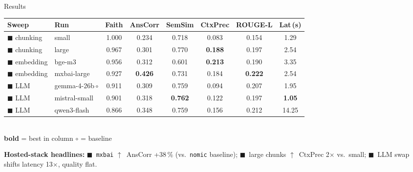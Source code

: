 \documentclass{beamer}
\begin{document}
\begin{frame}{}
\begin{columns}[t, totalwidth=\textwidth]
\begin{column}{0.495\textwidth}
\begin{block}{Results}
	
	\begin{center}
	\renewcommand{\arraystretch}{1.1}
	\setlength{\tabcolsep}{3pt}
	\scriptsize
	\begin{tabular}{@{}l l c c c c c c@{}}
		\toprule
		\textbf{Sweep} & \textbf{Run} & \textbf{Faith} & \textbf{AnsCorr} & \textbf{SemSim} & \textbf{CtxPrec} & \textbf{ROUGE-L} & \textbf{Lat\,(s)} \\
		\midrule
		\textcolor{RMmidnight}{$\blacksquare$} chunking & small             & 1.000 & 0.234 & 0.718 & 0.083 & 0.154 & 1.29 \\
		\textcolor{RMmidnight}{$\blacksquare$} chunking & large             & 0.967 & 0.301 & 0.770 & \textbf{0.188} & 0.197 & 2.54 \\
		\textcolor{RMember}{$\blacksquare$} embedding   & bge-m3            & 0.956 & 0.312 & 0.601 & \textbf{0.213} & 0.190 & 3.35 \\
		\textcolor{RMember}{$\blacksquare$} embedding   & mxbai-large       & 0.927 & \textbf{0.426} & 0.731 & 0.184 & \textbf{0.222} & 2.54 \\
		\textcolor{RMocean}{$\blacksquare$} LLM         & gemma-4-26b\,$\circ$ & 0.911 & 0.309 & 0.759 & 0.094 & 0.207 & 1.95 \\
		\textcolor{RMocean}{$\blacksquare$} LLM         & mistral-small     & 0.901 & 0.318 & \textbf{0.762} & 0.122 & 0.197 & \textbf{1.05} \\
		\textcolor{RMocean}{$\blacksquare$} LLM         & qwen3-flash       & 0.866 & 0.348 & 0.759 & 0.156 & 0.212 & 14.25 \\
		\bottomrule
	\end{tabular}\\[-0.1em]
	{\scriptsize \textbf{bold} = best in column \quad $\circ$ = baseline}
	\end{center}

	{\scriptsize\textbf{Hosted-stack headlines:}
	\textcolor{RMember}{$\blacksquare$}~\texttt{mxbai} $\uparrow$~AnsCorr +38\,\% (vs.\ \texttt{nomic} baseline); \quad
	\textcolor{RMmidnight}{$\blacksquare$}~large chunks $\uparrow$~CtxPrec 2$\times$ vs.\ small; \quad
	\textcolor{RMocean}{$\blacksquare$}~LLM swap shifts latency 13$\times$, quality flat.}
\end{block}

\end{column}

\end{columns}

\medskip


\end{frame}
\end{document}
